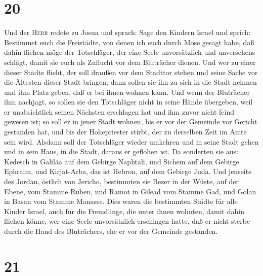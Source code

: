 \hypertarget{section-19}{%
\section{20}\label{section-19}}

 Und der \textsc{Herr} redete zu Josua und sprach:
 Sage den Kindern Israel und sprich: Bestimmet euch die
Freistädte, von denen ich euch durch Mose gesagt habe, 
daß dahin fliehen möge der Totschläger, der eine Seele unvorsätzlich und
unversehens schlägt, damit sie euch als Zuflucht vor dem Bluträcher
dienen.  Und wer zu einer dieser Städte flieht, der soll
draußen vor dem Stadttor stehen und seine Sache vor die Ältesten dieser
Stadt bringen; dann sollen sie ihn zu sich in die Stadt nehmen und ihm
Platz geben, daß er bei ihnen wohnen kann.  Und wenn der
Bluträcher ihm nachjagt, so sollen sie den Totschläger nicht in seine
Hände übergeben, weil er unabsichtlich seinen Nächsten erschlagen hat
und ihm zuvor nicht feind gewesen ist;  so soll er in
jener Stadt wohnen, bis er vor der Gemeinde vor Gericht gestanden hat,
und bis der Hohepriester stirbt, der zu derselben Zeit im Amte sein
wird. Alsdann soll der Totschläger wieder umkehren und in seine Stadt
gehen und in sein Haus, in die Stadt, daraus er geflohen ist.
 Da sonderten sie aus: Kedesch in Galiläa auf dem Gebirge
Naphtali, und Sichem auf dem Gebirge Ephraim, und Kirjat-Arba, das ist
Hebron, auf dem Gebirge Juda.  Und jenseits des Jordan,
östlich von Jericho, bestimmten sie Bezer in der Wüste, auf der Ebene,
vom Stamme Ruben, und Ramot in Gilead vom Stamme Gad, und Golan in Basan
vom Stamme Manasse.  Dies waren die bestimmten Städte für
alle Kinder Israel, auch für die Fremdlinge, die unter ihnen wohnten,
damit dahin fliehen könne, wer eine Seele unvorsätzlich erschlagen
hatte, daß er nicht sterbe durch die Hand des Bluträchers, ehe er vor
der Gemeinde gestanden.

\hypertarget{section-20}{%
\section{21}\label{section-20}}

